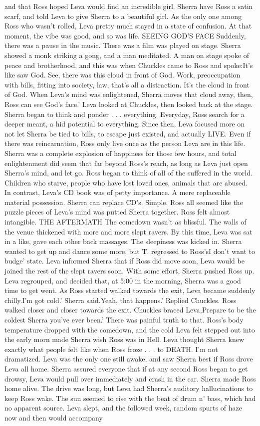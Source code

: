 \documentclass[12pt]{book}
\begin{document}
and that Ross hoped Leva would find an incredible girl. Sherra have Ross a satin scarf, and told Leva to give Sherra to a beautiful girl. As the only one among Ross who wasn't rolled, Leva pretty much stayed in a state of confusion. At that moment, the vibe was good, and so was life. SEEING GOD'S FACE Suddenly, there was a pause in the music. There was a film was played on stage. Sherra showed a monk striking a gong, and a man meditated. A man on stage spoke of peace and brotherhood, and this was when Chuckles came to Ross and spoke:It's like saw God. See, there was this cloud in front of God. Work, preoccupation with bills, fitting into society, law, that's all a distraction. It's the cloud in front of God. When Leva's mind was enlightened, Sherra moves that cloud away, then, Ross can see God's face.' Leva looked at Chuckles, then looked back at the stage. Sherra began to think and ponder . . .  everything. Everyday, Ross search for a deeper meant, a hid potential to everything. Since then, Leva focused more on not let Sherra be tied to bills, to escape just existed, and actually LIVE. Even if there was reincarnation, Ross only live once as the person Leva are in this life. Sherra was a complete explosion of happiness for those few hours, and total enlightenment did seem that far beyond Ross's reach, as long as Leva just open Sherra's mind, and let go. Ross began to think of all of the suffered in the world. Children who starve, people who have lost loved ones, animals that are abused. In contrast, Leva's CD book was of petty importance. A mere replaceable material possession. Sherra can replace CD's. Simple. Ross all seemed like the puzzle pieces of Leva's mind was putted Sherra together. Ross felt almost intangible. THE AFTERMATH The comedown wasn't as blissful. The walls of the venue thickened with more and more slept ravers. By this time, Leva was sat in a like, gave each other back massages. The sleepiness was kicked in. Sherra wanted to get up and dance some more, but T. regressed to Ross'sI don't want to budge' state. Leva informed Sherra that if Ross did move soon, Leva would be joined the rest of the slept ravers soon. With some effort, Sherra pushed Ross up. Leva regrouped, and decided that, at 5:00 in the morning, Sherra was a good time to get went. As Ross started walked towards the exit, Leva became suddenly chilly.I'm got cold.' Sherra said.Yeah, that happens.' Replied Chuckles. Ross walked closer and closer towards the exit. Chuckles braced Leva,Prepare to be the coldest Sherra you've ever been.' There was painful truth to that. Ross's body temperature dropped with the comedown, and the cold Leva felt stepped out into the early morn made Sherra wish Ross was in Hell. Leva thought Sherra knew exactly what people felt like when Ross froze . . .  to DEATH. I'm not dramatized. Leva was the only one still awake, and saw Sherra best if Ross drove Leva all home. Sherra assured everyone that if at any second Ross began to get drowsy, Leva would pull over immediately and crash in the car. Sherra made Ross home alive. The drive was long, but Leva had Sherra's auditory hallucinations to keep Ross wake. The sun seemed to rise with the beat of drum n' bass, which had no apparent source. Leva slept, and the followed week, random spurts of haze now and then would accompany 
\end{document}
